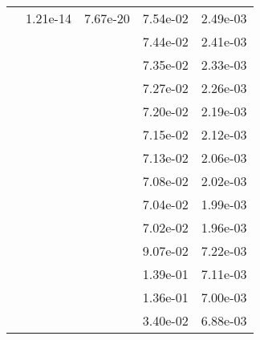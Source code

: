\begin{table}
\begin{tabular}{c|cc|cc|}
\multicolumn{1}{|c|}{} & \multicolumn{1}{|c|}{  1.21e-14} & \multicolumn{1}{|c|}{  7.67e-20} & \multicolumn{1}{|c|}{  7.54e-02} & \multicolumn{1}{|c|}{  2.49e-03} \\ 
\multicolumn{1}{|c|}{} & \multicolumn{1}{|c|}{} & \multicolumn{1}{|c|}{} & \multicolumn{1}{|c|}{  7.44e-02} & \multicolumn{1}{|c|}{  2.41e-03} \\ 
\multicolumn{1}{|c|}{} & \multicolumn{1}{|c|}{} & \multicolumn{1}{|c|}{} & \multicolumn{1}{|c|}{  7.35e-02} & \multicolumn{1}{|c|}{  2.33e-03} \\ 
\multicolumn{1}{|c|}{} & \multicolumn{1}{|c|}{} & \multicolumn{1}{|c|}{} & \multicolumn{1}{|c|}{  7.27e-02} & \multicolumn{1}{|c|}{  2.26e-03} \\ 
\multicolumn{1}{|c|}{} & \multicolumn{1}{|c|}{} & \multicolumn{1}{|c|}{} & \multicolumn{1}{|c|}{  7.20e-02} & \multicolumn{1}{|c|}{  2.19e-03} \\ 
\multicolumn{1}{|c|}{} & \multicolumn{1}{|c|}{} & \multicolumn{1}{|c|}{} & \multicolumn{1}{|c|}{  7.15e-02} & \multicolumn{1}{|c|}{  2.12e-03} \\ 
\multicolumn{1}{|c|}{} & \multicolumn{1}{|c|}{} & \multicolumn{1}{|c|}{} & \multicolumn{1}{|c|}{  7.13e-02} & \multicolumn{1}{|c|}{  2.06e-03} \\ 
\multicolumn{1}{|c|}{} & \multicolumn{1}{|c|}{} & \multicolumn{1}{|c|}{} & \multicolumn{1}{|c|}{  7.08e-02} & \multicolumn{1}{|c|}{  2.02e-03} \\ 
\multicolumn{1}{|c|}{} & \multicolumn{1}{|c|}{} & \multicolumn{1}{|c|}{} & \multicolumn{1}{|c|}{  7.04e-02} & \multicolumn{1}{|c|}{  1.99e-03} \\ 
\multicolumn{1}{|c|}{} & \multicolumn{1}{|c|}{} & \multicolumn{1}{|c|}{} & \multicolumn{1}{|c|}{  7.02e-02} & \multicolumn{1}{|c|}{  1.96e-03} \\ 
\multicolumn{1}{|c|}{} & \multicolumn{1}{|c|}{} & \multicolumn{1}{|c|}{} & \multicolumn{1}{|c|}{  9.07e-02} & \multicolumn{1}{|c|}{  7.22e-03} \\ 
\multicolumn{1}{|c|}{} & \multicolumn{1}{|c|}{} & \multicolumn{1}{|c|}{} & \multicolumn{1}{|c|}{  1.39e-01} & \multicolumn{1}{|c|}{  7.11e-03} \\ 
\multicolumn{1}{|c|}{} & \multicolumn{1}{|c|}{} & \multicolumn{1}{|c|}{} & \multicolumn{1}{|c|}{  1.36e-01} & \multicolumn{1}{|c|}{  7.00e-03} \\ 
\multicolumn{1}{|c|}{} & \multicolumn{1}{|c|}{} & \multicolumn{1}{|c|}{} & \multicolumn{1}{|c|}{  3.40e-02} & \multicolumn{1}{|c|}{  6.88e-03} \\ 

\end{tabular}
\end{table}
